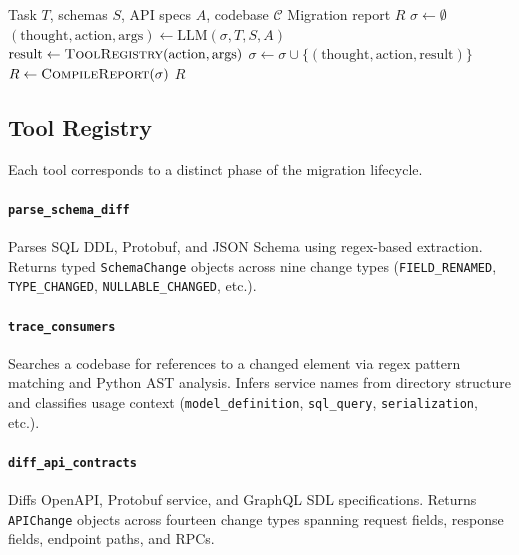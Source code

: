\documentclass[10pt,twocolumn]{article}
\begin{document}
\begin{algorithm}[h]
\caption{CARA ReAct Loop}
\label{alg:react}
\begin{algorithmic}[1]
\Require Task $T$, schemas $S$, API specs $A$, codebase $\mathcal{C}$
\Ensure Migration report $R$
\State $\sigma \gets \emptyset$ 
\Repeat
  \State $(\text{thought}, \text{action}, \text{args}) \gets \text{LLM}(\sigma, T, S, A)$
  \State $\text{result} \gets \textsc{ToolRegistry}(\text{action}, \text{args})$
  \State $\sigma \gets \sigma \cup \{(\text{thought}, \text{action}, \text{result})\}$
\State $R \gets \textsc{CompileReport}(\sigma)$
\Return $R$
\end{algorithmic}
\end{algorithm}

\subsection{Tool Registry}

Each tool corresponds to a distinct phase of the migration lifecycle.

\paragraph{\texttt{parse\_schema\_diff}} Parses SQL DDL, Protobuf, and JSON
Schema using regex-based extraction. Returns typed \texttt{SchemaChange} objects
across nine change types (\texttt{FIELD\_RENAMED}, \texttt{TYPE\_CHANGED},
\texttt{NULLABLE\_CHANGED}, etc.).

\paragraph{\texttt{trace\_consumers}} Searches a codebase for references to a
changed element via regex pattern matching and Python AST analysis. Infers
service names from directory structure and classifies usage context
(\texttt{model\_definition}, \texttt{sql\_query}, \texttt{serialization}, etc.).

\paragraph{\texttt{diff\_api\_contracts}} Diffs OpenAPI, Protobuf service, and
GraphQL SDL specifications. Returns \texttt{APIChange} objects across fourteen
change types spanning request fields, response fields, endpoint paths, and RPCs.
\end{document}
